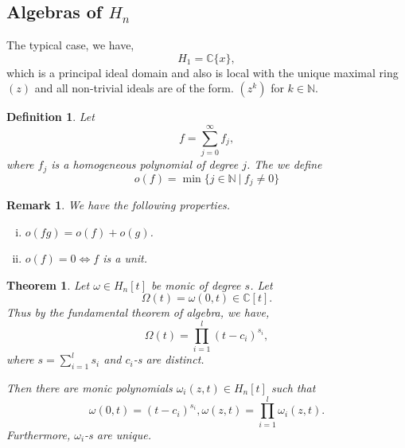 \documentclass{article}
\newtheorem{theorem}{Theorem} [section]
\newtheorem{definition}{Definition}[section]
\newtheorem{remark}{Remark}[section]
\newcommand{\N}[0]{\mathbb{N}}
\newcommand{\C}[0]{\mathbb{C}}
\newcommand{\sep}[0]{\:|\:}
\begin{document}
\subsection{Algebras of $H_n$}

The typical case, we have,
\begin{equation*}
  H_1 = \C\{x\},
\end{equation*}
which is a principal ideal domain and also is local with the unique maximal ring $(z)$ and all non-trivial ideals are of the form. $(z^k)$ for $k\in\N$.

\begin{definition}
  Let 
  \begin{equation*}
    f = \sum_{j=0}^\infty f_j,
  \end{equation*}
  where $f_j$ is a homogeneous polynomial of degree $j$. The we define 
  \begin{equation*}
    o(f) = \min\{j\in\N\sep f_j\not=0\}
  \end{equation*}
\end{definition}

\begin{remark}
  We have the following properties.
  \begin{enumerate}[i).]
    \item $o(fg) = o(f)+o(g)$.
    \item $o(f) = 0\Leftrightarrow f$ is a unit.
  \end{enumerate}
\end{remark}

\begin{theorem}
  \label{theorem_4_2}
  Let $\omega\in H_n[t]$ be monic of degree $s$. Let 
  \begin{equation*}
    \Omega(t) = \omega(0,t)\in\C[t].
  \end{equation*}
  Thus by the fundamental theorem of algebra, we have,
  \begin{equation*}
    \Omega(t) = \prod_{i=1}^l(t-c_i)^{s_i},
  \end{equation*}
  where $s = \sum_{i=1}^l s_i$ and $c_i$-s are distinct.
  \par Then there are monic polynomials $\omega_i(z,t)\in H_n[t]$ such that 
  \begin{equation*}
    \omega(0,t) = (t-c_i)^{s_i}, \omega(z,t) = \prod_{i=1}^l \omega_i(z,t).
  \end{equation*}
  Furthermore, $\omega_i$-s are unique.
\end{theorem}
\end{document}
